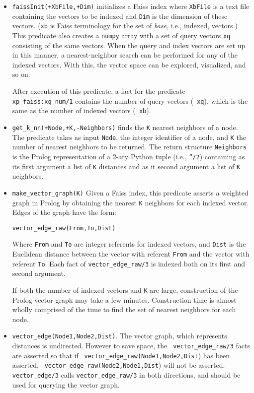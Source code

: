 \begin{itemize}
\item {\tt faissInit(+XbFile,+Dim)} initializes a Faiss index where
  {\tt XbFile} is a text file containing the vectors to be indexed and
  {\tt Dim} is the dimension of these vectors. ({\tt xb} is Faiss
  terminology for the set of {\em base}, i.e., indexed, vectors.)
  This predicate also creates a {\tt numpy} array with a set of query
  vectors {\tt xq} consisting of the same vectors.  When the query and
  index vectors are set up in this manner, a nearest-neighbor search
  can be performed for any of the indexed vectors.  With this, the
  vector space can be explored, visualized, and so on.

  After execution of this predicate, a fact for the predicate {\tt
    xp\_faiss:xq\_num/1} contains the number of query vectors ({\tt
    xq}), which is the same as the number of indexed vectors ({\tt
    xb}).

\item {\tt get\_k\_nn(+Node,+K,-Neighbors)} finds the {\tt K} nearest
  neighbors of a node.  The predicate takes as input {\tt Node}, the
  integer identifier of a node, and {\tt K} the number of nearest
  neighbors to be returned.  The return structure {\tt Neighbors} is
  the Prolog representation of a 2-ary Python tuple (i.e., {\tt ''/2})
  containing as its first argument a list of {\tt K} distances and as
  it second argument a list of {\tt K} neighbors.


\item {\tt make\_vector\_graph(K)} Given a Faiss index, this predicate
  asserts a weighted graph in Prolog by obtaining the nearest {\tt K}
  neighbors for each indexed vector.  Edges of the graph have the form:

  {\tt vector\_edge\_raw(From,To,Dist)}

  \noindent
  Where {\tt From} and {\tt To} are integer referents for indexed
  vectors, and {\tt Dist} is the Euclidean distance between the vector
  with referent {\tt From} and the vector with referent {\tt To}.
  Each fact of {\tt vector\_edge\_raw/3} is indexed both on its first
  and second argument.

  If both the number of indexed vectors and {\tt K} are large,
  construction of the Prolog vector graph may take a few minutes.
  Construction time is almost wholly comprised of the time to find the
  set of nearest neighbors for each node.

\item {\tt vector\_edge(Node1,Node2,Dist)}.  The vector graph, which
  represents distances is undirected.  However to save space, the {\tt
    vector\_edge\_raw/3} facts are asserted so that if {\tt
    vector\_edge\_raw(Node1,Node2,Dist}) has been asserted, {\tt
    vector\_edge\_raw(Node2,Node1,Dist}) will not be asserted.  {\tt
    vector\_edge/3} calls {\tt vector\_edge\_raw/3} in both
  directions, and should be used for querying the vector graph.
  

\end{itemize}
